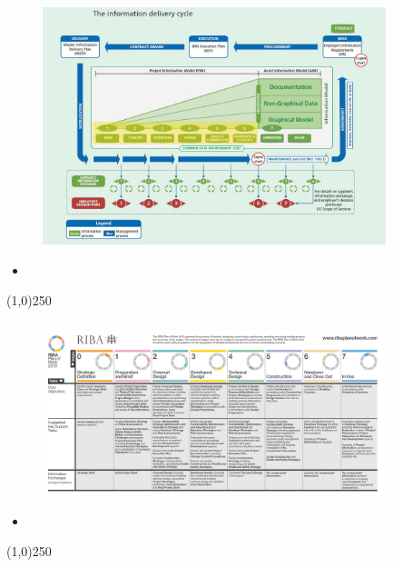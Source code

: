 \begin{frame}
\frametitle{}
\begin{figure}
	\centering
	\includegraphics[width=10cm]{./images/Pas-1192-2-2013.jpg}
	\caption[]{}
	\label{fig:}
\end{figure}
\begin{itemize}
	\item 
\end{itemize}
\end{frame}
\begin{center}\line(1,0){250}\end{center}


\begin{frame}
\frametitle{}
\begin{figure}
	\centering
	\includegraphics[width=10cm]{./images/RIBAPlanofworkstable.png}
	\caption[]{}
	\label{fig:}
\end{figure}
\begin{itemize}
	\item 
\end{itemize}
\end{frame}
\begin{center}\line(1,0){250}\end{center}


